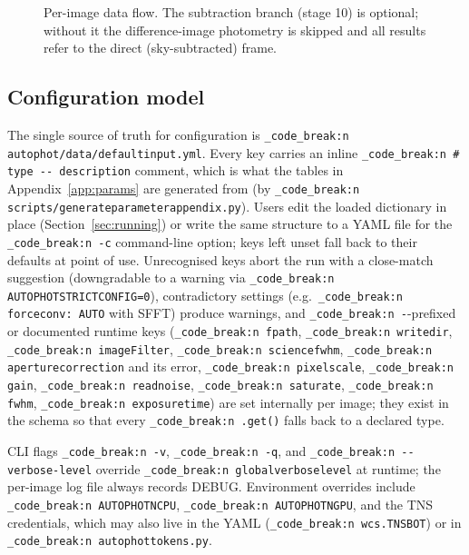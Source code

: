 \documentclass[11pt,a4paper]{article}
\renewcommand{\_}{\autophotunderscore\allowbreak}
\DeclareRobustCommand{\code}[1]{\texttt{\autophot_code_break:n {#1}}}
\newcommand{\eg}{e.g.\ }
\begin{document}
\begin{figure}[t]
\caption{Per-image data flow. The subtraction branch (stage 10) is optional;
without it the difference-image photometry is skipped and all results refer
to the direct (sky-subtracted) frame.}
\label{fig:flow}
\end{figure}

\subsection{Configuration model}
\label{sec:config}

The single source of truth for configuration is
\code{autophot/data/default\_input.yml}. Every key carries an inline
\code{\# type -{}- description} comment, which is what the tables in
Appendix~\ref{app:params} are generated from (by
\code{scripts/generate\_parameter\_appendix.py}). Users edit the loaded
dictionary in place (Section~\ref{sec:running}) or write the same
structure to a YAML file for the \code{-c} command-line option; keys
left unset fall back to their defaults at point of use. Unrecognised
keys abort the run with a close-match suggestion (downgradable to a
warning via \code{AUTOPHOT\_STRICT\_CONFIG=0}), contradictory
settings (\eg \code{forceconv: AUTO} with SFFT) produce warnings, and
\code{-}-prefixed or documented runtime keys (\code{fpath},
\code{write\_dir}, \code{imageFilter}, \code{science\_fwhm},
\code{aperture\_correction} and its error, \code{pixel\_scale},
\code{gain}, \code{read\_noise}, \code{saturate}, \code{fwhm},
\code{exposure\_time}) are set internally per image; they exist in the
schema so that every \code{.get()} falls back to a declared type.

CLI flags \code{-v}, \code{-q}, and \code{-{}-verbose-level} override
\code{global\_verbose\_level} at runtime; the per-image log file always
records DEBUG. Environment overrides include \code{AUTOPHOT\_NCPU},
\code{AUTOPHOT\_NGPU}, and the TNS credentials, which may also live in the
YAML (\code{wcs.TNS\_BOT\_*}) or in \code{autophot\_tokens.py}.
\end{document}
